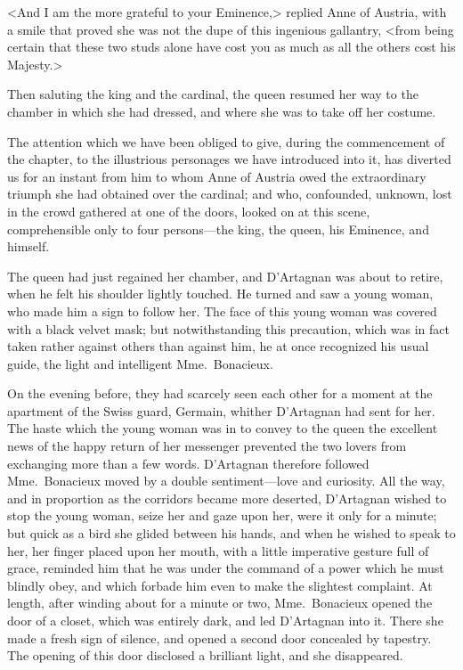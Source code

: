 <And I am the more grateful to your Eminence,> replied Anne of Austria, with a smile that proved she was not the dupe of this ingenious gallantry, <from being certain that these two studs alone have cost you as much as all the others cost his Majesty.> 

Then saluting the king and the cardinal, the queen resumed her way to the chamber in which she had dressed, and where she was to take off her costume. 

The attention which we have been obliged to give, during the commencement of the chapter, to the illustrious personages we have introduced into it, has diverted us for an instant from him to whom Anne of Austria owed the extraordinary triumph she had obtained over the cardinal; and who, confounded, unknown, lost in the crowd gathered at one of the doors, looked on at this scene, comprehensible only to four persons—the king, the queen, his Eminence, and himself. 

The queen had just regained her chamber, and D'Artagnan was about to retire, when he felt his shoulder lightly touched. He turned and saw a young woman, who made him a sign to follow her. The face of this young woman was covered with a black velvet mask; but notwithstanding this precaution, which was in fact taken rather against others than against him, he at once recognized his usual guide, the light and intelligent Mme.~Bonacieux. 

On the evening before, they had scarcely seen each other for a moment at the apartment of the Swiss guard, Germain, whither D'Artagnan had sent for her. The haste which the young woman was in to convey to the queen the excellent news of the happy return of her messenger prevented the two lovers from exchanging more than a few words. D'Artagnan therefore followed Mme.~Bonacieux moved by a double sentiment—love and curiosity. All the way, and in proportion as the corridors became more deserted, D'Artagnan wished to stop the young woman, seize her and gaze upon her, were it only for a minute; but quick as a bird she glided between his hands, and when he wished to speak to her, her finger placed upon her mouth, with a little imperative gesture full of grace, reminded him that he was under the command of a power which he must blindly obey, and which forbade him even to make the slightest complaint. At length, after winding about for a minute or two, Mme.~Bonacieux opened the door of a closet, which was entirely dark, and led D'Artagnan into it. There she made a fresh sign of silence, and opened a second door concealed by tapestry. The opening of this door disclosed a brilliant light, and she disappeared. 

